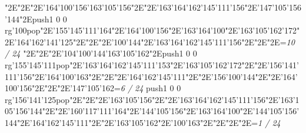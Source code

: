 \null\vfill\enskip\enskip\enskip\ipa\char"2E\enskip\enskip\enskip\ipa\char"2E\enskip\ipa\char"2E\ipa\char'164\ipa\char'100\ipa\char'156\bigskip\ipa\char'163\ipa\char'105\ipa\char'156\ipa\char"2E\enskip\enskip\enskip\ipa\char"2E\ipa\char'163\ipa\char'164\ipa\char'162\ipa\char'145\ipa\char'111\ipa\char'156\bigskip\enskip\enskip\ipa\char"2E\ipa\char'147\ipa\char'105\ipa\char'156\ipa\char'144\ipa\char"2E\pdfcolorstack\match push{1 0 0 rg}\ipa\char'100\pdfcolorstack\match pop{}\ipa\char"2E\ipa\char'155\ipa\char'145\ipa\char'111\ipa\char'164\ipa\char"2E\ipa\char'164\ipa\char'100\ipa\char'156\ipa\char"2E\ipa\char'163\ipa\char'164\ipa\char'100\ipa\char"2E\ipa\char'163\ipa\char'105\ipa\char'162\ipa\char'172\bigskip\enskip\ipa\char"2E\ipa\char'164\ipa\char'162\ipa\char'141\ipa\char'125\ipa\char"2E\enskip\enskip\ipa\char"2E\enskip\enskip\enskip\ipa\char"2E\ipa\char'100\ipa\char'144\ipa\char"2E\ipa\char'163\ipa\char'164\ipa\char'162\ipa\char'145\ipa\char'111\ipa\char'156\bigskip\enskip\enskip\enskip\ipa\char"2E\enskip\enskip\ipa\char"2E\enskip\enskip\enskip\ipa\char"2E\enskip\enskip\enskip\bigskip\vfill\footline={\hfill\tenrm\it 10 / 24}\eject
\null\vfill\enskip\enskip\enskip\ipa\char"2E\enskip\enskip\enskip\ipa\char"2E\enskip\ipa\char"2E\ipa\char'104\ipa\char'100\ipa\char'144\bigskip\ipa\char'163\ipa\char'105\ipa\char'162\ipa\char"2E\pdfcolorstack\match push{1 0 0 rg}\ipa\char'155\ipa\char'145\ipa\char'111\pdfcolorstack\match pop{}\ipa\char"2E\ipa\char'163\ipa\char'164\ipa\char'162\ipa\char'145\ipa\char'111\ipa\char'153\bigskip\enskip\enskip\ipa\char"2E\ipa\char'163\ipa\char'105\ipa\char'162\ipa\char'172\ipa\char"2E\enskip\ipa\char"2E\ipa\char'156\ipa\char'141\ipa\char'111\ipa\char'156\ipa\char"2E\ipa\char'164\ipa\char'100\ipa\char'163\ipa\char"2E\enskip\enskip\enskip\ipa\char"2E\enskip\enskip\enskip\enskip\bigskip\enskip\ipa\char"2E\ipa\char'164\ipa\char'162\ipa\char'145\ipa\char'111\ipa\char"2E\enskip\enskip\ipa\char"2E\ipa\char'156\ipa\char'100\ipa\char'144\ipa\char"2E\enskip\enskip\ipa\char"2E\enskip\enskip\enskip\enskip\enskip\enskip\bigskip\ipa\char'164\ipa\char'100\ipa\char'156\ipa\char"2E\enskip\enskip\ipa\char"2E\enskip\enskip\enskip\ipa\char"2E\ipa\char'147\ipa\char'105\ipa\char'162\bigskip\vfill\footline={\hfill\tenrm\it 6 / 24}\eject
\null\vfill\pdfcolorstack\match push{1 0 0 rg}\ipa\char'156\ipa\char'141\ipa\char'125\pdfcolorstack\match pop{}\ipa\char"2E\enskip\enskip\enskip\ipa\char"2E\enskip\ipa\char"2E\enskip\enskip\enskip\bigskip\ipa\char'163\ipa\char'105\ipa\char'156\ipa\char"2E\enskip\enskip\enskip\ipa\char"2E\ipa\char'163\ipa\char'164\ipa\char'162\ipa\char'145\ipa\char'111\ipa\char'156\bigskip\enskip\enskip\ipa\char"2E\ipa\char'163\ipa\char'105\ipa\char'156\ipa\char'144\ipa\char"2E\enskip\ipa\char"2E\ipa\char'160\ipa\char'117\ipa\char'111\ipa\char'164\ipa\char"2E\ipa\char'144\ipa\char'105\ipa\char'156\ipa\char"2E\ipa\char'163\ipa\char'164\ipa\char'100\ipa\char"2E\ipa\char'144\ipa\char'105\ipa\char'156\ipa\char'144\bigskip\enskip\ipa\char"2E\ipa\char'164\ipa\char'162\ipa\char'145\ipa\char'111\ipa\char"2E\enskip\enskip\ipa\char"2E\ipa\char'163\ipa\char'105\ipa\char'162\ipa\char"2E\ipa\char'100\ipa\char'163\ipa\char"2E\enskip\enskip\enskip\enskip\enskip\enskip\bigskip\enskip\enskip\enskip\ipa\char"2E\enskip\enskip\ipa\char"2E\enskip\enskip\enskip\ipa\char"2E\enskip\enskip\enskip\bigskip\vfill\footline={\hfill\tenrm\it 1 / 24}\eject
